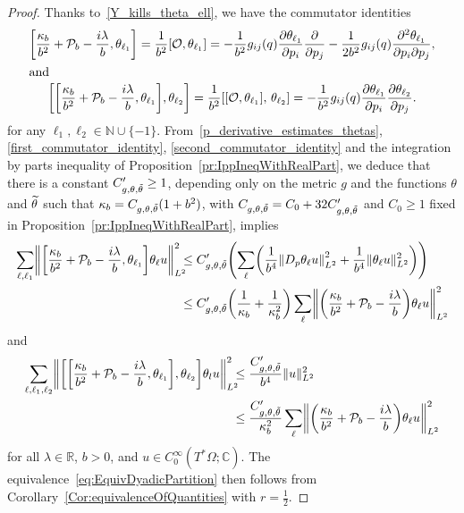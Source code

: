 \documentclass[10pt]{amsart}
\theoremstyle{definition}\newtheorem{defi}[theo]{Definition}\newtheorem{rema}[theo]{Remark}\newtheorem{exam}[theo]{Example}\newtheorem{exem}[theo]{Example}\newtheorem{nota}[theo]{Notation}
\newcommand{\C}{\mathbb{C}}
\newcommand{\R}{\mathbb{R}}
\newcommand{\N}{\mathbb{N}}
\newcommand{\clO}{\mathcal{O}}
\newcommand{\clP}{\mathcal{P}}
\newcommand\norm[1]{\left\lVert#1\right\rVert}
\let\oldtilde\tilde
\renewcommand*{\tilde}[1]{\mathchoice{\widetilde{#1}}{\widetilde{#1}}{\oldtilde{#1}}{\oldtilde{#1}}}
\let\originalleft\left
\let\originalright\right
\renewcommand{\left}{\mathopen{}\mathclose\bgroup\originalleft}
\renewcommand{\right}{\aftergroup\egroup\originalright}
\begin{document}
\begin{proof}
Thanks to~\eqref{Y_kills_theta_ell}, we have the commutator identities
\begin{gather}
\left[\frac{\kappa_{b}}{b^{2}}+\clP_{b}-\frac{i\lambda}{b},\theta_{\ell_{1}} \right] = \frac{1}{b^{2}}[\clO,\theta_{\ell_{1}}] = -\frac{1}{b^{2}}g_{ij}(q)\frac{\partial \theta_{\ell_{1}}}{\partial p_{i}} \frac{\partial}{\partial p_{j}}-\frac{1}{2b^{2}}g_{ij}(q)\frac{\partial^{2} \theta_{\ell_{1}}}{\partial p_{i} \partial p_{j}},
\label{first_commutator_identity}
\\
\intertext{and}
\left[\left[\frac{\kappa_{b}}{b^{2}}+\clP_{b}-\frac{i\lambda}{b},\theta_{\ell_{1}}\right],\theta_{\ell_{2}}\right] =\frac{1}{b^{2}}[[\clO,\theta_{\ell_{1}}],\,\theta_{\ell_{2}}] = -\frac{1}{b^{2}}g_{ij}(q) \frac{\partial \theta_{\ell_{1}}}{\partial p_{i}} \frac{\partial \theta_{\ell_{2}}}{\partial p_{j}}.\label{second_commutator_identity}
\end{gather}
for any $\ell_1, \ell_2 \in \N \cup \{-1\}$. From~\eqref{p_derivative_estimates_thetas}, \eqref{first_commutator_identity}, \eqref{second_commutator_identity} and the integration by parts inequality of Proposition~\ref{pr:IppIneqWithRealPart}, we deduce that there is a constant $C'_{g, \theta, \tilde{\theta}} \ge 1$, depending only on the metric $g$ and the functions $\theta$ and $\tilde{\theta}$ such that $\kappa_b = C_{g, \theta, \tilde{\theta}}(1+b^2)$, with $C_{g, \theta, \tilde{\theta}} = C_{0}+32C'_{g, \theta, \tilde{\theta}}$ and $C_0\geq 1$ fixed in Proposition~\ref{pr:IppIneqWithRealPart}, implies
\begin{align}
\sum_{\ell,\ell_{1}} \norm{\left[\frac{\kappa_{b}}{b^{2}}+\clP_{b}-\frac{i\lambda}{b},\theta_{\ell_{1}} \right] \theta_{\ell} u}^{2}_{L^2}\mkern-10mu
& \leq C'_{g,\theta, \tilde{\theta}}
\left(
\sum_{\ell} \left(\frac{1}{b^{4}}\left\|D_{p}\theta_{\ell}u\right\|^{2}_{L^2} + \frac{1}{b^{4}}\| \theta_{\ell}u\|^{2}_{L^2} \right) \right) \\
& \leq C'_{g,\theta, \tilde{\theta}} \left(\frac{1}{\kappa_{b}}+\frac{1}{\kappa_{b}^{2}}\right) \sum_{\ell} \norm{ \left(\frac{\kappa_{b}}{b^{2}}+\clP_{b}-\frac{i\lambda}{b}\right) \theta_{\ell}u}^{2}_{L^2}\notag
\end{align}
and
\begin{align}
\sum_{\ell,\ell_{1},\ell_{2}} \norm{\left[\left[\frac{\kappa_{b}}{b^{2}}+\clP_{b}-\frac{i\lambda}{b},\theta_{\ell_{1}} \right],\theta_{\ell_{2}} \right] \theta_{l}u}^{2}_{L^2}\mkern-10mu
&\leq \frac{C'_{g,\theta, \tilde{\theta}}}{b^{4}} \|u\|^{2}_{L^2} \\
&\leq \frac{C'_{g,\theta, \tilde{\theta}}}{\kappa_{b}^{2}}\sum_{\ell} \norm{ \left(\frac{\kappa_{b}}{b^{2}}+\clP_{b}-\frac{i\lambda}{b}\right) \theta_{\ell}u}^{2}_{L^2}\notag
\end{align}
for all $\lambda \in \R$, $b>0$, and $u \in C^\infty_0(T^* \Omega; \C)$. The equivalence~\eqref{eq:EquivDyadicPartition} then follows from Corollary~\ref{Cor:equivalenceOfQuantities} with $r=\frac{1}{2}$.
\end{proof}
\end{document}
